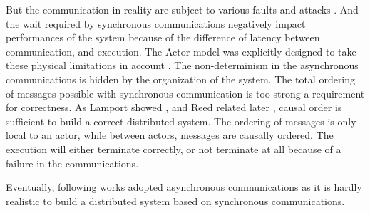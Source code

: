 But the communication in reality are subject to various faults and attacks \cite{Lamport1982}.
And the wait required by synchronous communications negatively impact performances of the system because of the difference of latency between communication, and execution.
The Actor model was explicitly designed to take these physical limitations in account \cite{Hewitt1977a}.
The non-determinism in the asynchronous communications is hidden by the organization of the system.
The total ordering of messages possible with synchronous communication is too strong a requirement for correctness.
As Lamport showed \cite{Lamport1978}, and Reed related later \cite{Reed2012}, causal order is sufficient to build a correct distributed system.
The ordering of messages is only local to an actor, while between actors, messages are causally ordered.
The execution will either terminate correctly, or not terminate at all because of a failure in the communications.

Eventually, following works adopted asynchronous communications as it is hardly realistic to build a distributed system based on synchronous communications.














